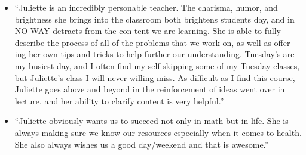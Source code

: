 \documentclass[letterpaper,11pt]{article}
\begin{document}
\begin{itemize}
\begin{itemize}
\item ``Juliette is an incredibly personable teacher. The charisma, humor, and brightness she brings into the classroom both brightens students day, and in NO WAY detracts from the con tent we are learning. She is able to fully describe the process of all of the problems that we work on, as well as offer ing her own tips and tricks to help further our understanding. Tuesday’s are my busiest day, and I often find my self skipping some of my Tuesday classes, but Juliette’s class I will never willing miss. As difficult as I find this course, Juliette goes above and beyond in the reinforcement of ideas went over in lecture, and her ability to clarify content is very helpful.''

\item ``Juliette obviously wants us to succeed not only in math but in life. She is always making sure we know our resources especially when it comes to health. She also always wishes us a good day/weekend and that is awesome.''
\end{itemize}
\end{itemize}
\end{document}
